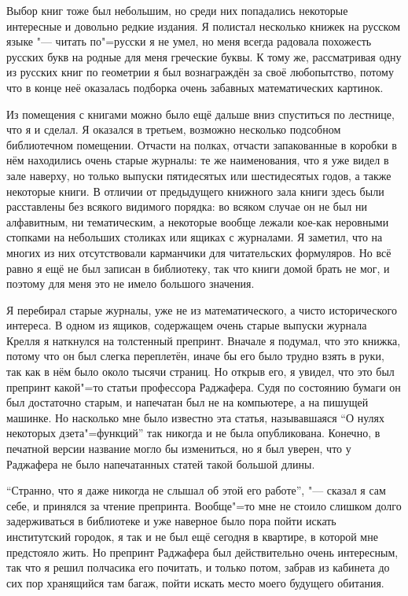 Выбор книг тоже был небольшим, но среди них попадались некоторые интересные и
довольно редкие издания.
Я полистал несколько книжек на русском языке "--- читать по"=русски я не умел,
но меня всегда радовала похожесть русских букв на родные для меня греческие
буквы.
К тому же, рассматривая одну из русских книг по геометрии я был вознаграждён за
своё любопытство, потому что в конце неё оказалась подборка очень забавных
математических картинок.

Из помещения с книгами можно было ещё дальше вниз спуститься по лестнице, что я
и сделал.
Я оказался в третьем, возможно несколько подсобном библиотечном помещении.
Отчасти на полках, отчасти запакованные в коробки в нём находились очень старые
журналы:
те же наименования, что я уже видел в зале наверху, но только выпуски
пятидесятых или шестидесятых годов, а также некоторые книги.
В отличии от предыдущего книжного зала книги здесь были расставлены без всякого
видимого порядка: во всяком случае он не был ни алфавитным, ни тематическим, а
некоторые вообще лежали кое-как неровными стопками на небольших столиках или
ящиках с журналами.
Я заметил, что на многих из них отсутствовали карманчики для читательских
формуляров.
Но всё равно я ещё не был записан в библиотеку, так что книги домой брать не мог,
и поэтому для меня это не имело большого значения.

Я перебирал старые журналы, уже не из математического, а чисто исторического
интереса.
В одном из ящиков, содержащем очень старые выпуски журнала Крелля я наткнулся на
толстенный препринт.
Вначале я подумал, что это книжка, потому что он был слегка переплетён, иначе бы
его было трудно взять в руки, так как в нём было около тысячи страниц.
Но открыв его, я увидел, что это был препринт какой"=то статьи профессора
Раджафера.
Судя по состоянию бумаги он был достаточно старым, и напечатан был не на
компьютере, а на пишущей машинке.
Но насколько мне было известно эта статья, называвшаяся \enquote{О нулях
некоторых дзета"=функций} так никогда и не была опубликована.
Конечно, в печатной версии название могло бы измениться, но я был уверен, что у
Раджафера не было напечатанных статей такой большой длины.

\enquote{Странно, что я даже никогда не слышал об этой его работе}, "--- сказал
я сам себе, и принялся за чтение препринта.
Вообще"=то мне не стоило слишком долго задерживаться в библиотеке и уже наверное
было пора пойти искать институтский городок, я так и не был ещё сегодня в
квартире, в которой мне предстояло жить.
Но препринт Раджафера был действительно очень интересным, так что я решил
полчасика его почитать, и только потом, забрав из кабинета до сих пор хранящийся
там багаж, пойти искать место моего будущего обитания.

